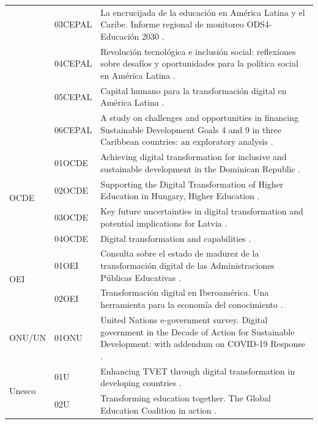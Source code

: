 \begin{table}[htpb]
\begin{threeparttable}
\begin{tabular}{ll >{\raggedright\arraybackslash}p{}}
        & 03CEPAL & La encrucijada de la educación en América Latina y el
        Caribe. Informe regional de monitoreo ODS4-Educación 2030 \cite{unesco2022}. \\
        & 04CEPAL & Revolución tecnológica e inclusión social: reflexiones sobre
        desafíos y oportunidades para la política social en América Latina
        \cite{Velasquez2020Revolucion}. \\
        & 05CEPAL & Capital humano para la transformación digital en América
        Latina \cite{katz2018capital}. \\
        & 06CEPAL & A study on challenges and opportunities in financing
        Sustainable Development Goals 4 and 9 in three Caribbean countries: an
        exploratory analysis \cite{hendrickson2023study}. \\
        \multirow{4}{*}{OCDE} & 01OCDE & Achieving digital
        transformation for inclusive and sustainable development in the
        Dominican Republic \cite{OECD2022DominicanRepublic}. \\
        & 02OCDE & Supporting the Digital Transformation of Higher Education in
        Hungary, Higher Education \cite{OECD2021Hungary}. \\
        & 03OCDE & Key future uncertainties in digital transformation and
        potential implications for Latvia \cite{OECD2021Latvia}. \\
        & 04OCDE & Digital transformation and capabilities \cite{OECD2019Italy}. \\
        \multirow{2}{*}{OEI} & 01OEI & Consulta sobre el estado de
        madurez de la transformación digital de las Administraciones Públicas
        Educativas \cite{Mares2023Transformacion}. \\
        & 02OEI & Transformación digital en Iberoamérica. Una herramienta para
        la economía del conocimiento \cite{OEI2023TransformacionDigital}. \\
        ONU/UN & 01ONU & United Nations e-government survey. Digital
        government in the Decade of Action for Sustainable Development: with
        addendum on COVID-19 Response \cite{UN2020EGovernmentSurvey}. \\
        \multirow{5}{*}{Unesco} & 01U & Enhancing TVET through digital
        transformation in developing countries \cite{UNESCO2023EnhancingTVET}. \\
        & 02U & Transforming education together. The Global Education Coalition
        in action \cite{UNESCO2023TransformingEducation}. \\

\end{tabular}
\end{threeparttable}
\end{table}
